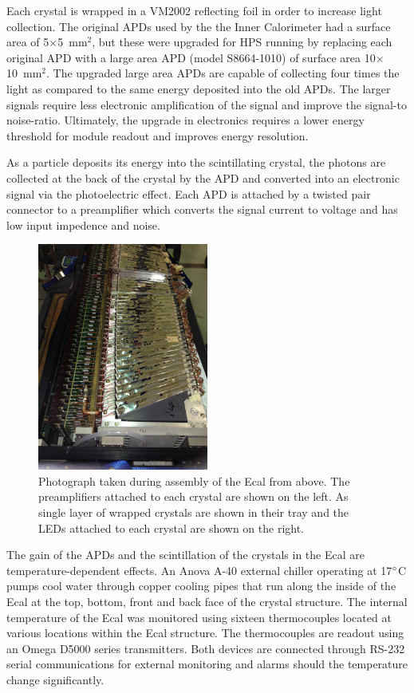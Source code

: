 Each crystal is wrapped in a VM2002 reflecting foil in order to increase light collection. The original APDs used by the the Inner Calorimeter had a surface area of 5$\times$5~mm$^2$, but these were upgraded for HPS running by replacing each original APD with a large area APD (model S8664-1010) of surface area 10$\times$10~mm$^2$. The upgraded large area APDs are capable of collecting four times the light as compared to the same energy deposited into the old APDs. The larger signals require less electronic amplification of the signal and improve the signal-to noise-ratio. Ultimately, the upgrade in electronics requires a lower energy threshold for module readout and improves energy resolution. 

As a particle deposits its energy into the scintillating crystal, the photons are collected at the back of the crystal by the APD and converted into an electronic signal via the photoelectric effect. Each APD is attached by a twisted pair connector to a preamplifier which converts the signal current to voltage and has low input impedence and noise.  

\begin{figure}[H]
  \centering
      \includegraphics[width=0.5\textwidth]{pics/experiment/ecalAssembly1.png}
  \caption[Photograph of Ecal crystals during assembly]{Photograph taken during assembly of the Ecal from above. The preamplifiers attached to each crystal are shown on the left. As single layer of wrapped crystals are shown in their tray and the LEDs attached to each crystal are shown on the right.}
  \label{Figure:ecalAssembly1}
\end{figure}

The gain of the APDs and the scintillation of the crystals in the Ecal are temperature-dependent effects. An Anova A-40 external chiller operating at 17$\degree$C pumps cool water through copper cooling pipes that run along the inside of the Ecal at the top, bottom, front and back face of the crystal structure. The internal temperature of the Ecal was monitored using sixteen thermocouples located at various locations within the Ecal structure. The thermocouples are readout using an Omega D5000 series transmitters. Both devices are connected through RS-232 serial communications for external monitoring and alarms should the temperature change significantly.

